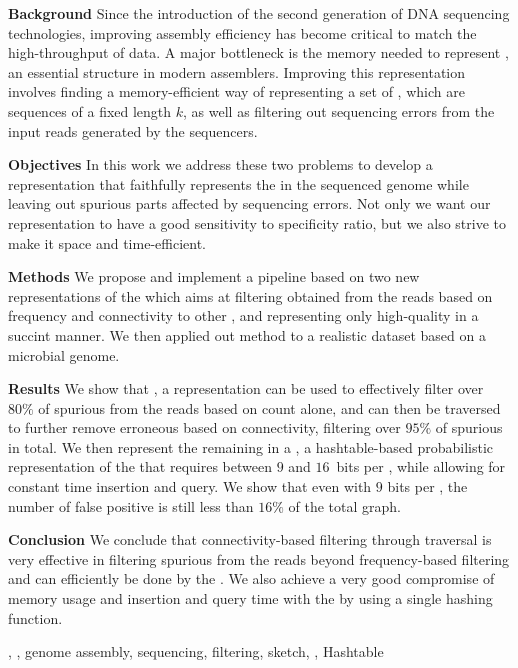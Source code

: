 \abstract

\textbf{Background} Since the introduction of the second generation of DNA sequencing technologies, improving assembly efficiency has become critical to match the high-throughput of data. A major bottleneck is the memory needed to represent , an essential structure in modern assemblers. Improving this representation involves finding a memory-efficient way of representing a set of \kmers, which are sequences of a fixed length $k$, as well as filtering out sequencing errors from the input reads generated by the sequencers.

\noindent\textbf{Objectives} In this work we address these two problems to develop a \dBG representation that faithfully represents the \kmers in the sequenced genome while leaving out spurious parts affected by sequencing errors. Not only we want our representation to have a good sensitivity to specificity ratio, but we also strive to make it space and time-efficient.

\noindent\textbf{Methods} We propose and implement a pipeline based on two new representations of the \dBG which aims at filtering  obtained from the reads based on frequency and connectivity to other , and representing only high-quality  in a succint manner. We then applied out method to a realistic dataset based on a microbial genome.

\noindent\textbf{Results} We show that \dBCM, a  representation can be used to effectively filter over $80\%$ of spurious  from the reads based on count alone, and can then be traversed to further remove erroneous  based on connectivity, filtering over $95\%$ of spurious  in total. We then represent the remaining  in a \dBHT, a hashtable-based probabilistic representation of the \dBG that requires between $9$ and $16$~bits per \kmer, while allowing for constant time insertion and query. We show that even with $9$ bits per \kmer, the number of false positive  is still less than $16\%$ of the total graph.

\noindent\textbf{Conclusion} We conclude that connectivity-based filtering through traversal is very effective in filtering spurious  from the reads beyond frequency-based filtering and can efficiently be done by the \dBCM. We also achieve a very good compromise of memory usage and insertion and query time with the \dBHT by using a single hashing function.

\begin{keywords}
\dBG, \kmer, genome assembly, sequencing, filtering, sketch, \cm, Hashtable
\end{keywords}